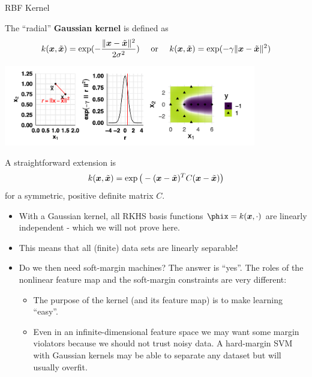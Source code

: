\begin{vbframe}{RBF Kernel}

The \enquote{radial} \textbf{Gaussian kernel} is defined as
$$k(\bm{x}, \tilde {\bm{x}}) = \exp(-\frac{\|\bm{x} - \tilde {\bm{x}}\|^2}{2\sigma^2}) \quad \text{ or } \quad k(\bm{x}, \tilde {\bm{x}}) = \exp(-\gamma \|\bm{x} - \tilde {\bm{x}}\|^2)$$

\begin{center}
\includegraphics[width = 11cm ]{figure_man/rbf_kernel.png}
\end{center}

A straightforward extension is
$$k(\bm{x},  \tilde {\bm{x}}) = \exp\big(- (\bm{x} -  \tilde {\bm{x}})^T C (\bm{x} -  \tilde {\bm{x}})\big)$$
for a symmetric, positive definite matrix $C$.

\framebreak

  \begin{itemize}

    \item With a Gaussian kernel, all RKHS basis functions 
      $\phix = k(\xv, \cdot)$ are linearly independent - which we will not prove here.
    \item This means that all (finite) data sets are linearly separable!
    \item Do we then need soft-margin machines? 
      The answer is \enquote{yes}. The roles of the nonlinear feature map and the
    soft-margin constraints are very different:
    \begin{itemize}
      \item The purpose of the kernel (and its feature map) is to make learning
      \enquote{easy}.
\item Even in an infinite-dimensional feature space we may want some
      margin violators because we should not trust noisy data. A hard-margin
      SVM with Gaussian kernels may be able to separate any dataset but will usually overfit.
    \end{itemize}
  \end{itemize}
\end{vbframe}

